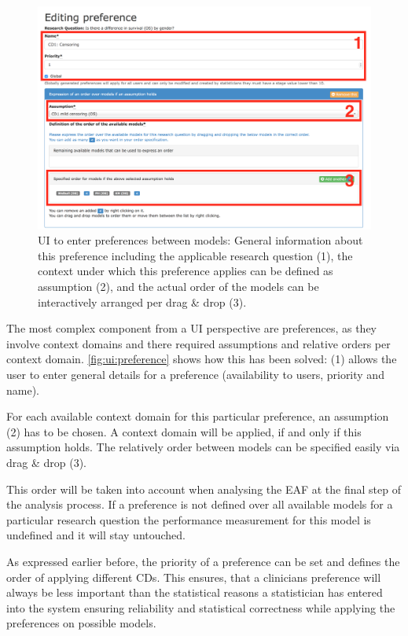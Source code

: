 \begin{figure}[htb]
	\centering
	\includegraphics[width=\textwidth]{figures/ui_preference}
	\caption{\gls{UI} to enter preferences between models: General information about this preference including the applicable research question (1), the context under which this preference applies can be defined as assumption (2), and the actual order of the models can be interactively arranged per drag \& drop (3).}
	\label{fig:ui:preference}
\end{figure}


The most complex component from a \gls{UI} perspective are preferences, as they involve context domains and there required assumptions and relative orders per context domain. \autoref{fig:ui:preference} shows how this has been solved: (1) allows the user to enter general details for a preference (availability to users, priority and name). 

For each available context domain for this particular preference, an assumption (2) has to be chosen. A context domain will be applied, if and only if this assumption holds. The relatively order between models can be specified easily via drag \& drop (3). 

This order will be taken into account when analysing the \gls{EAF} at the final step of the analysis process. If a preference is not defined over all available models for a particular research question the performance measurement for this model is undefined and it will stay untouched.

As expressed earlier before, the priority of a preference can be set and defines the order of applying different \glspl{CD}. This ensures, that a clinicians preference will always be less important than the statistical reasons a statistician has entered into the system ensuring reliability and statistical correctness while applying the preferences on possible models.

